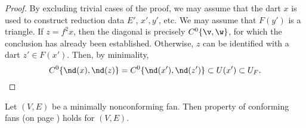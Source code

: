 \begin{proof}  
  By excluding trivial cases of the proof, we may assume that the dart $x$ 
  is used to construct reduction data $E'$, $x',y'$, etc. We may
  assume that $F(y')$ is a triangle.  If $z=f^2x$, then the diagonal
  is precisely $C^0\{\v,\w\}$, for which the conclusion has already
  been established.  Otherwise, $z$ can be identified with a dart
  $z'\in F(x')$.  Then, by minimality,
\[ 
C^0\{\nd(x),\nd(z)\} = C^0\{\nd(x'),\nd(z')\} \subset U(x') \subset U_F.
\] 
\end{proof}


\begin{lemma}[]\cutrate{} Let $(V,E)$ be a minimally nonconforming fan.  Then property  of conforming fans  (on page \pageref{halfspace:conformance})
holds for $(V,E)$.
\end{lemma}
%

